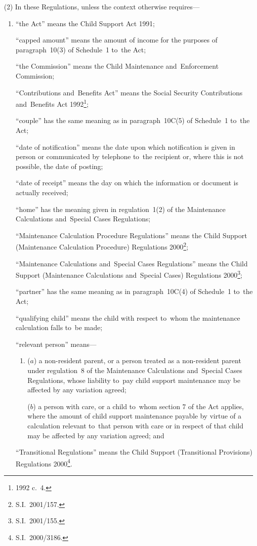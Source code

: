 \documentclass[12pt,a4paper]{article}
\begin{document}
(2) In these Regulations, unless the context otherwise requires—
\begin{enumerate}\item[]
“the Act” means the Child Support Act 1991;

“capped amount” means the amount of income for the purposes of paragraph~10(3) of Schedule~1 to~the Act;

“the Commission” means the Child Maintenance and~Enforcement Commission;

“Contributions and~Benefits Act” means the Social Security Contributions and~Benefits Act 1992\footnote{1992 c.\ 4.};

“couple” has the same meaning as in paragraph~10C(5) of Schedule~1 to~the Act;

“date of notification” means the date upon which notification is given in person or communicated by telephone to~the recipient or, where this is not possible, the date of posting;

“date of receipt” means the day on which the information or document is actually received;

“home” has the meaning given in regulation~1(2) of the Maintenance Calculations and~Special Cases Regulations;

“Maintenance Calculation Procedure Regulations” means the Child Support (Maintenance Calculation Procedure) Regulations 2000\footnote{S.I.\ 2001/157.};

“Maintenance Calculations and~Special Cases Regulations” means the Child Support (Maintenance Calculations and~Special Cases) Regulations 2000\footnote{S.I.\ 2001/155.};

“partner” has the same meaning as in paragraph~10C(4) of Schedule~1 to~the Act;

“qualifying child” means the child with respect to~whom the maintenance calculation falls to~be made;

“relevant person” means—
\begin{enumerate}\item[]
($a$) 
a non-resident parent, or a person treated as a non-resident parent under regulation~8 of the Maintenance Calculations and~Special Cases Regulations, whose liability to~pay child support maintenance may be affected by any variation agreed;

($b$) 
a person with care, or a child to~whom section 7 of the Act applies, where the amount of child support maintenance payable by virtue of a calculation relevant to~that person with care or in respect of that child may be affected by any variation agreed; and
\end{enumerate}

“Transitional Regulations” means the Child Support (Transitional Provisions) Regulations 2000\footnote{S.I.\ 2000/3186.}.
\end{enumerate}
\end{document}
